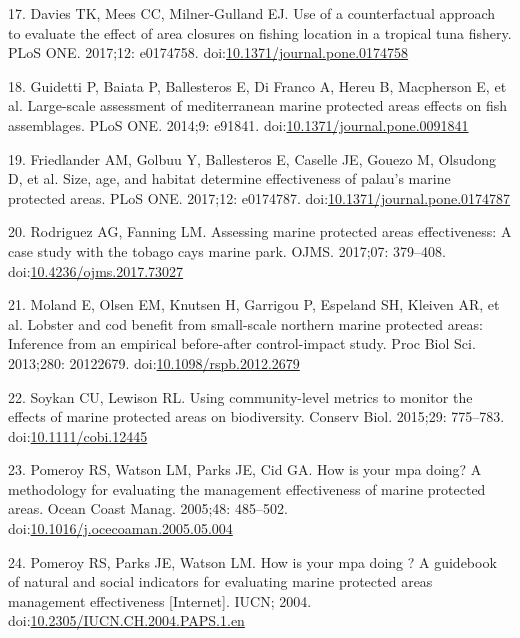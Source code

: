 \documentclass[12pt,]{article}
\begin{document}
\hypertarget{ref-davies_2017-ml}{}
17. Davies TK, Mees CC, Milner-Gulland EJ. Use of a counterfactual
approach to evaluate the effect of area closures on fishing location in
a tropical tuna fishery. PLoS ONE. 2017;12: e0174758.
doi:\href{https://doi.org/10.1371/journal.pone.0174758}{10.1371/journal.pone.0174758}

\hypertarget{ref-guidetti_2014-8Z}{}
18. Guidetti P, Baiata P, Ballesteros E, Di Franco A, Hereu B,
Macpherson E, et al. Large-scale assessment of mediterranean marine
protected areas effects on fish assemblages. PLoS ONE. 2014;9: e91841.
doi:\href{https://doi.org/10.1371/journal.pone.0091841}{10.1371/journal.pone.0091841}

\hypertarget{ref-friedlander_2017-oI}{}
19. Friedlander AM, Golbuu Y, Ballesteros E, Caselle JE, Gouezo M,
Olsudong D, et al. Size, age, and habitat determine effectiveness of
palau's marine protected areas. PLoS ONE. 2017;12: e0174787.
doi:\href{https://doi.org/10.1371/journal.pone.0174787}{10.1371/journal.pone.0174787}

\hypertarget{ref-rodriguez_2017-PD}{}
20. Rodriguez AG, Fanning LM. Assessing marine protected areas
effectiveness: A case study with the tobago cays marine park. OJMS.
2017;07: 379--408.
doi:\href{https://doi.org/10.4236/ojms.2017.73027}{10.4236/ojms.2017.73027}

\hypertarget{ref-moland_2013-VP}{}
21. Moland E, Olsen EM, Knutsen H, Garrigou P, Espeland SH, Kleiven AR,
et al. Lobster and cod benefit from small-scale northern marine
protected areas: Inference from an empirical before-after control-impact
study. Proc Biol Sci. 2013;280: 20122679.
doi:\href{https://doi.org/10.1098/rspb.2012.2679}{10.1098/rspb.2012.2679}

\hypertarget{ref-soykan_2015-nu}{}
22. Soykan CU, Lewison RL. Using community-level metrics to monitor the
effects of marine protected areas on biodiversity. Conserv Biol.
2015;29: 775--783.
doi:\href{https://doi.org/10.1111/cobi.12445}{10.1111/cobi.12445}

\hypertarget{ref-pomeroy_2005-Py}{}
23. Pomeroy RS, Watson LM, Parks JE, Cid GA. How is your mpa doing? A
methodology for evaluating the management effectiveness of marine
protected areas. Ocean Coast Manag. 2005;48: 485--502.
doi:\href{https://doi.org/10.1016/j.ocecoaman.2005.05.004}{10.1016/j.ocecoaman.2005.05.004}

\hypertarget{ref-pomeroy_2004-23}{}
24. Pomeroy RS, Parks JE, Watson LM. How is your mpa doing ? A guidebook
of natural and social indicators for evaluating marine protected areas
management effectiveness {[}Internet{]}. IUCN; 2004.
doi:\href{https://doi.org/10.2305/IUCN.CH.2004.PAPS.1.en}{10.2305/IUCN.CH.2004.PAPS.1.en}
\end{document}
